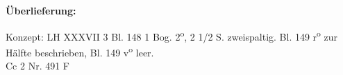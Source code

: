       
               
                \begin{ledgroupsized}[r]{120mm}
                \footnotesize 
                \pstart                
                \noindent\textbf{\"{U}berlieferung:}   
                \pend
                \end{ledgroupsized}
            
              
                            \begin{ledgroupsized}[r]{114mm}
                            \footnotesize 
                            \pstart \parindent -6mm
                            Konzept: LH XXXVII 3 Bl. 148 1 Bog. 2\textsuperscript{o}, 2 1/2 S. zweispaltig. Bl. 149 r\textsuperscript{o} zur H\"{a}lfte beschrieben, Bl. 149 v\textsuperscript{o} leer.\\Cc 2 Nr. 491 F \pend
                            \end{ledgroupsized}
                \vspace*{8mm}
                \pstart 
                \normalsize
